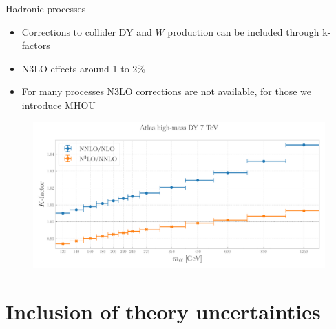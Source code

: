 \documentclass[aspectratio=169, 9pt,t]{beamer}
\begin{document}
\begin{frame}{Hadronic processes}
  \begin{itemize}
    \item Corrections to collider DY and $W$ production can be included through k-factors
    \item N3LO effects around 1 to 2\%
    \item For many processes N3LO corrections are not available, for those we introduce MHOU
  \end{itemize}
  \begin{figure}[!t]
    \centering
    \includegraphics[width=.80\textwidth]{figures/kfactor_ATLASZHIGHMASS49FB.pdf}
  \end{figure}
\end{frame}


\section{Inclusion of theory uncertainties}
\end{document}

